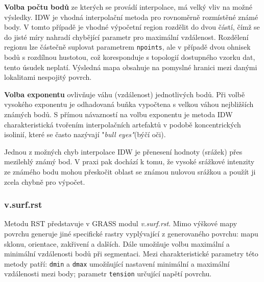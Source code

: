 \documentclass[a4paper,12pt,oneside]{report}
\begin{document}
\begin{description}
\item \textbf{Volba počtu bodů} ze kterých se provádí interpolace, má
  velký vliv na možné výsledky. IDW je vhodná interpolační metoda pro
  rovnoměrně rozmístěné známé body. V tomto případě je vhodné
  výpočetní region rozdělit do dvou částí, čímž se do jisté míry
  nahradí chybějící parametr pro maximální vzdálenost. Rozdělení
  regionu lze částečně suplovat parametrem \texttt{npoints}, ale v
  případě dvou ohnisek bodů s rozdílnou hustotou, což koresponduje s
  topologií dostupného vzorku dat, tento úsudek neplatí. Výsledná mapa
  obsahuje na pomy\-slné hranici mezi danými lokalitami nespojitý povrch.

\item \textbf{Volba exponentu} ovlivňuje váhu (vzdálenost)
  jednotlivých bodů. Při volbě vysokého exponentu je odhadovaná buňka
  vypočtena s velkou váhou nej\-bližších známých bodů. S přímou
  návazností na volbu exponentu je metoda IDW charakteristická
  tvořením interpolačních artefaktů v podobě koncentrických isolinií,
  které se často nazývají "\textit{bull eyes"}(býčí oči).
\end{description} 



Jednou z možných chyb interpolace IDW je přenesení hodnoty (srážek)
přes mezilehlý známý bod. V praxi pak dochází k tomu, že vysoké
srážkové intenzity ze známého bodu mohou přeskočit oblast se známou
nulovou srážkou a použít ji zcela chybně pro výpočet.



\subsubsection*{v.surf.rst}
Metodu RST představuje v GRASS modul \textit{v.surf.rst}. Mimo výškové mapy povrchu generuje jiné  specifické rastry vyplývající z
generovaného povrchu: mapu sklonu, orientace, zakřivení a
dalších. Dále umožňuje volbu maximální a minimální vzdálenosti bodů
při segmentaci. Mezi charakteristické parametry této metody patří:
\texttt{dmin} a \texttt{dmax} umožňující nastavení minimální a
maximální vzdálenosti mezi body; parametr \texttt{tension} určující
napětí povrchu.
\end{document}
